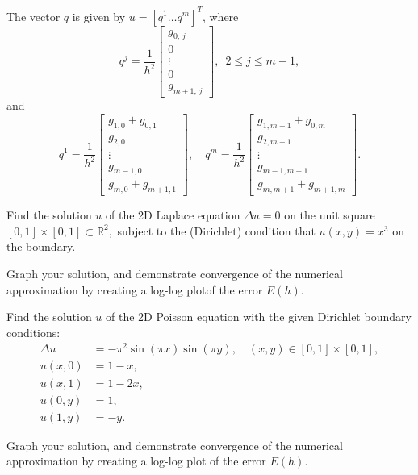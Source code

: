 The vector $q$ is given by $u = [q^1 \ldots q^m]^T$, where 
\[
q^j = \frac{1}{h^2}
\begin{bmatrix} g_{0,\,j} \\ 0 \\ \vdots \\0\\ g_{m+1,\,j} \end{bmatrix} , \,\,\, 2 \leq j \leq m-1,
\]
and 
\[
q^1 = \frac{1}{h^2}\begin{bmatrix} g_{1,0} + g_{0,1} \\ g_{2,0} \\ \vdots \\ g_{m-1,0}\\ g_{m,0} + g_{m+1,1}\end{bmatrix}, \quad q^m = \frac{1}{h^2}\begin{bmatrix} g_{1,m+1} + g_{0,m}\\ g_{2,m+1} \\ \vdots \\ g_{m-1,m+1}\\ g_{m,m+1} + g_{m+1,m}\end{bmatrix}.
\]

\begin{problem}
	Find the solution $u$ of the 2D Laplace equation $\Delta u = 0$ on the unit 
	square $[0,1]\times [0,1] \subset \mathbb{R}^2,$ subject to the (Dirichlet) condition that 
	$u(x,y) = x^3$ on the boundary. 
	
	Graph your solution, and demonstrate convergence of the numerical approximation by 
	creating a log-log plotof the error $E(h).$
\end{problem}

\begin{problem}
	Find the solution $u$ of the 2D Poisson equation with the given Dirichlet boundary conditions:
	\begin{align*}
		\Delta u &= -\pi^2 \sin(\pi x)\sin(\pi y), \quad (x,y) \in [0,1]\times [0,1], \\
		u(x,0) &= 1-x, \\
		u(x,1) &= 1-2x, \\
		u(0,y) &= 1, \\
		u(1,y) &= -y. 
	\end{align*}
	
	Graph your solution, and demonstrate convergence of the numerical approximation by 
	creating a log-log plot of the error $E(h).$
\end{problem}

